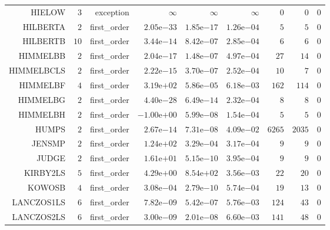 \begin{longtable}{rrrrrrrrr}
HIELOW & \(     3\) & exception & \(\infty\) & \(\infty\) & \(\infty\) & \(     0\) & \(     0\) & \(     0\) \\
HILBERTA & \(     2\) & first\_order & \( 2.05\)e\(-33\) & \( 1.85\)e\(-17\) & \( 1.26\)e\(-04\) & \(     5\) & \(     5\) & \(     0\) \\
HILBERTB & \(    10\) & first\_order & \( 3.44\)e\(-14\) & \( 8.42\)e\(-07\) & \( 2.85\)e\(-04\) & \(     6\) & \(     6\) & \(     0\) \\
HIMMELBB & \(     2\) & first\_order & \( 2.04\)e\(-17\) & \( 1.48\)e\(-07\) & \( 4.97\)e\(-04\) & \(    27\) & \(    14\) & \(     0\) \\
HIMMELBCLS & \(     2\) & first\_order & \( 2.22\)e\(-15\) & \( 3.70\)e\(-07\) & \( 2.52\)e\(-04\) & \(    10\) & \(     7\) & \(     0\) \\
HIMMELBF & \(     4\) & first\_order & \( 3.19\)e\(+02\) & \( 5.86\)e\(-05\) & \( 6.18\)e\(-03\) & \(   162\) & \(   114\) & \(     0\) \\
HIMMELBG & \(     2\) & first\_order & \( 4.40\)e\(-28\) & \( 6.49\)e\(-14\) & \( 2.32\)e\(-04\) & \(     8\) & \(     8\) & \(     0\) \\
HIMMELBH & \(     2\) & first\_order & \(-1.00\)e\(+00\) & \( 5.99\)e\(-08\) & \( 1.54\)e\(-04\) & \(     5\) & \(     5\) & \(     0\) \\
HUMPS & \(     2\) & first\_order & \( 2.67\)e\(-14\) & \( 7.31\)e\(-08\) & \( 4.09\)e\(-02\) & \(  6265\) & \(  2035\) & \(     0\) \\
JENSMP & \(     2\) & first\_order & \( 1.24\)e\(+02\) & \( 3.29\)e\(-04\) & \( 3.17\)e\(-04\) & \(     9\) & \(     9\) & \(     0\) \\
JUDGE & \(     2\) & first\_order & \( 1.61\)e\(+01\) & \( 5.15\)e\(-10\) & \( 3.95\)e\(-04\) & \(     9\) & \(     9\) & \(     0\) \\
KIRBY2LS & \(     5\) & first\_order & \( 4.29\)e\(+00\) & \( 8.54\)e\(+02\) & \( 3.56\)e\(-03\) & \(    22\) & \(    20\) & \(     0\) \\
KOWOSB & \(     4\) & first\_order & \( 3.08\)e\(-04\) & \( 2.79\)e\(-10\) & \( 5.74\)e\(-04\) & \(    19\) & \(    13\) & \(     0\) \\
LANCZOS1LS & \(     6\) & first\_order & \( 7.82\)e\(-09\) & \( 5.42\)e\(-07\) & \( 5.76\)e\(-03\) & \(   124\) & \(    43\) & \(     0\) \\
LANCZOS2LS & \(     6\) & first\_order & \( 3.00\)e\(-09\) & \( 2.01\)e\(-08\) & \( 6.60\)e\(-03\) & \(   141\) & \(    48\) & \(     0\) \\

\end{longtable}
